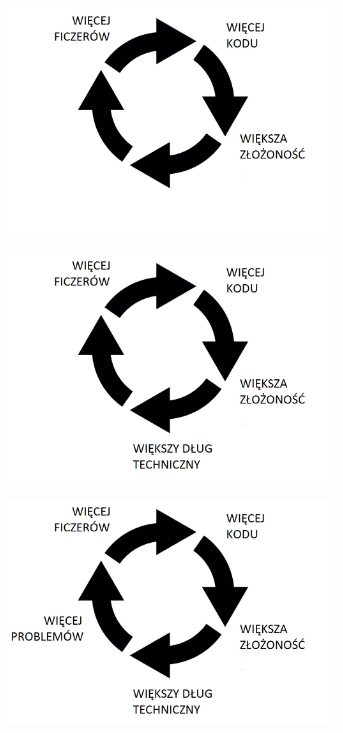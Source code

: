 \documentclass{beamer}
\begin{document}
\begin{frame}{}
\begin{center}
  	\includegraphics[height=6cm]{pgf4.jpg}
\end{center}
\end{frame}

\begin{frame}{}
\begin{center}
  	\includegraphics[height=6cm]{pgf5.jpg}
\end{center}
\end{frame}

\begin{frame}{}
\begin{center}
  	\includegraphics[height=6cm]{pgf6.jpg}
\end{center}
\end{frame}
\end{document}
